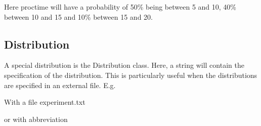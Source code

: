 \documentclass[letterpaper,10pt,english]{sphinxmanual}
\begin{document}
Here proctime will have a probability of 50\% being between 5 and 10, 40\% between 10 and 15 and 10\% between 15 and 20.


\subsection{Distribution}
\label{\detokenize{Distributions:distribution}}
A special distribution is the Distribution class. Here, a string will contain the specification of the distribution.
This is particularly useful when the distributions are specified in an external file. E.g.

\begin{sphinxVerbatim}[commandchars=\\\{\}]
    
      
      
      
\end{sphinxVerbatim}

With a file experiment.txt

\begin{sphinxVerbatim}[commandchars=\\\{\}]
\end{sphinxVerbatim}

or with abbreviation

\begin{sphinxVerbatim}[commandchars=\\\{\}]
\end{sphinxVerbatim}
\end{document}
